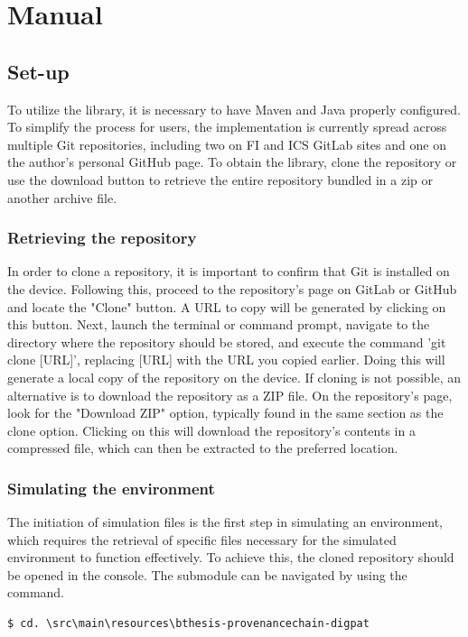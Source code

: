 \documentclass[
  digital,     %
  oneside,     %
  nosansbold,  %
  nocolorbold, %
  lof,         %
  lot,         %
]{fithesis4}
\begin{document}
\chapter{Manual}
\shorthandoff{-}
\section{Set-up}
To utilize the library, it is necessary to have Maven and Java properly configured. To simplify the process for users, the implementation is currently spread across multiple Git repositories, including two on FI and ICS GitLab sites and one on the author's personal GitHub page. To obtain the library, clone the repository or use the download button to retrieve the entire repository bundled in a zip or another archive file.

\subsection{Retrieving the repository}
In order to clone a repository, it is important to confirm that Git is installed on the device. Following this, proceed to the repository's page on GitLab or GitHub and locate the "Clone" button. A URL to copy will be generated by clicking on this button. Next, launch the terminal or command prompt, navigate to the directory where the repository should be stored, and execute the command 'git clone [URL]', replacing [URL] with the URL you copied earlier. Doing this will generate a local copy of the repository on the device. If cloning is not possible, an alternative is to download the repository as a ZIP file. On the repository's page, look for the "Download ZIP" option, typically found in the same section as the clone option. Clicking on this will download the repository's contents in a compressed file, which can then be extracted to the preferred location.

\subsection{Simulating the environment}
The initiation of simulation files is the first step in simulating an environment, which requires the retrieval of specific files necessary for the simulated environment to function effectively. To achieve this, the cloned repository should be opened in the console. The submodule can be navigated by using the command.

\begin{verbatim}
$ cd. \src\main\resources\bthesis-provenancechain-digpat  
\end{verbatim}
\end{document}

